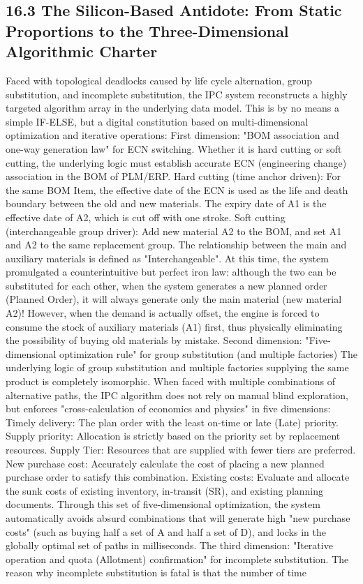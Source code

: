 \documentclass[11pt,a4paper]{article}
\begin{document}
\subsection*{16.3 The Silicon-Based Antidote: From Static Proportions to the Three-Dimensional Algorithmic Charter}


Faced with topological deadlocks caused by life cycle alternation, group substitution, and incomplete substitution, the IPC system reconstructs a highly targeted algorithm array in the underlying data model. This is by no means a simple IF-ELSE, but a digital constitution based on multi-dimensional optimization and iterative operations: First dimension: "BOM association and one-way generation law" for ECN switching. Whether it is hard cutting or soft cutting, the underlying logic must establish accurate ECN (engineering change) association in the BOM of PLM/ERP. Hard cutting (time anchor driven): For the same BOM Item, the effective date of the ECN is used as the life and death boundary between the old and new materials. The expiry date of A1 is the effective date of A2, which is cut off with one stroke. Soft cutting (interchangeable group driver): Add new material A2 to the BOM, and set A1 and A2 to the same replacement group. The relationship between the main and auxiliary materials is defined as "Interchangeable". At this time, the system promulgated a counterintuitive but perfect iron law: although the two can be substituted for each other, when the system generates a new planned order (Planned Order), it will always generate only the main material (new material A2)! However, when the demand is actually offset, the engine is forced to consume the stock of auxiliary materials (A1) first, thus physically eliminating the possibility of buying old materials by mistake. Second dimension: "Five-dimensional optimization rule" for group substitution (and multiple factories) The underlying logic of group substitution and multiple factories supplying the same product is completely isomorphic. When faced with multiple combinations of alternative paths, the IPC algorithm does not rely on manual blind exploration, but enforces "cross-calculation of economics and physics" in five dimensions: Timely delivery: The plan order with the least on-time or late (Late) priority. Supply priority: Allocation is strictly based on the priority set by replacement resources. Supply Tier: Resources that are supplied with fewer tiers are preferred. New purchase cost: Accurately calculate the cost of placing a new planned purchase order to satisfy this combination. Existing costs: Evaluate and allocate the sunk costs of existing inventory, in-transit (SR), and existing planning documents. Through this set of five-dimensional optimization, the system automatically avoids absurd combinations that will generate high "new purchase costs" (such as buying half a set of A and half a set of D), and locks in the globally optimal set of paths in milliseconds. The third dimension: "Iterative operation and quota (Allotment) confirmation" for incomplete substitution. The reason why incomplete substitution is fatal is that the number of time 
\end{document}
